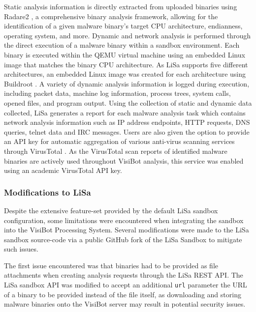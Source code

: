 Static analysis information is directly extracted from uploaded binaries using Radare2 \citep{Radare2}, a comprehensive binary analysis framework, allowing for the identification of a given malware binary's target CPU architecture, endianness, operating system, and more. Dynamic and network analysis is performed through the direct execution of a malware binary within a sandbox environment. Each binary is executed within the QEMU virtual machine using an embedded Linux image that matches the binary CPU architecture. As LiSa supports five different architectures, an embedded Linux image was created for each architecture using Buildroot \citep{Buildroot}. A variety of dynamic analysis information is logged during execution, including packet data, machine log information, process trees, system calls, opened files, and program output. Using the collection of static and dynamic data collected, LiSa generates a report for each malware analysis task which contains network analysis information such as IP address endpoints, HTTP requests, DNS queries, telnet data and IRC messages. Users are also given the option to provide an API key for automatic aggregation of various anti-virus scanning services through VirusTotal \citep{VirusTotal}. As the VirusTotal scan reports of identified malware binaries are actively used throughout VisiBot analysis, this service was enabled using an academic VirusTotal API key.

\subsubsection{Modifications to LiSa}

Despite the extensive feature-set provided by the default LiSa sandbox configuration, some limitations were encountered when integrating the sandbox into the VisiBot Processing System. Several modifications were made to the LiSa sandbox source-code via a public GitHub fork of the LiSa Sandbox \citep{LiSaModified} to mitigate such issues.

The first issue encountered was that binaries had to be provided as file attachments when creating analysis requests through the LiSa REST API. The LiSa sandbox API was modified to accept an additional \texttt{url} parameter the URL of a binary to be provided instead of the file itself, as downloading and storing malware binaries onto the VisiBot server may result in potential security issues.

